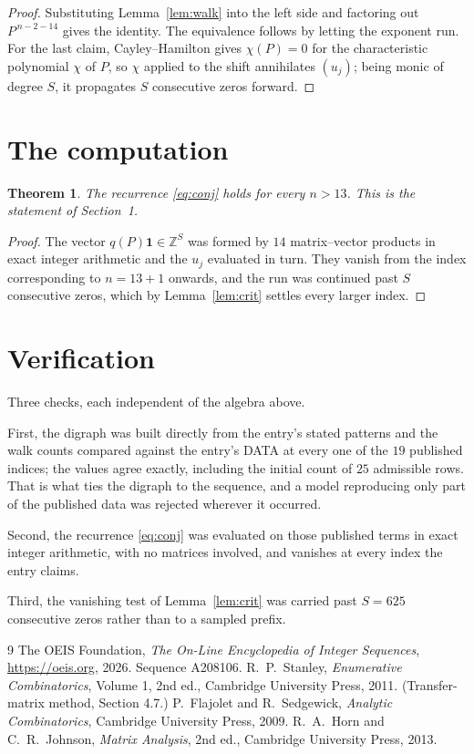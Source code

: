 \documentclass[11pt,a4paper]{article}
\theoremstyle{plain}
\newtheorem{theorem}{Theorem}
\theoremstyle{definition}
\begin{document}
\begin{proof}
Substituting Lemma~\ref{lem:walk} into the left side and factoring out
$P^{\,n-2-14}$ gives the identity. The equivalence follows by letting the exponent
run. For the last claim, Cayley--Hamilton gives $\chi(P)=0$ for the characteristic
polynomial $\chi$ of $P$, so $\chi$ applied to the shift annihilates $(u_j)$; being monic of
degree $S$, it propagates $S$ consecutive zeros forward.
\end{proof}

\section{The computation}

\begin{theorem}
The recurrence \eqref{eq:conj} holds for every $n>13$. This is the statement of
Section~1.
\end{theorem}

\begin{proof}
The vector $q(P)\mathbf{1}\in\mathbb{Z}^{S}$ was formed by $14$ matrix--vector
products in exact integer arithmetic and the $u_j$ evaluated in turn. They vanish from the
index corresponding to $n=13+1$ onwards, and the run was continued past $S$ consecutive
zeros, which by Lemma~\ref{lem:crit} settles every larger index.
\end{proof}

\section{Verification}

Three checks, each independent of the algebra above.

First, the digraph was built directly from the entry's stated patterns and the walk counts
compared against the entry's DATA at every one of the $19$ published indices; the
values agree exactly, including the initial count of $25$ admissible rows. That is
what ties the digraph to the sequence, and a model reproducing only part of the published
data was rejected wherever it occurred.

Second, the recurrence \eqref{eq:conj} was evaluated on those published terms in exact
integer arithmetic, with no matrices involved, and vanishes at every index the entry claims.

Third, the vanishing test of Lemma~\ref{lem:crit} was carried past $S=625$ consecutive
zeros rather than to a sampled prefix.

\begin{thebibliography}{9}
 The OEIS Foundation, \emph{The On-Line Encyclopedia of Integer
Sequences}, \url{https://oeis.org}, 2026. Sequence A208106.
 R.~P.~Stanley, \emph{Enumerative Combinatorics}, Volume 1, 2nd ed.,
Cambridge University Press, 2011. (Transfer-matrix method, Section 4.7.)
 P.~Flajolet and R.~Sedgewick, \emph{Analytic Combinatorics}, Cambridge
University Press, 2009.
 R.~A.~Horn and C.~R.~Johnson, \emph{Matrix Analysis}, 2nd ed., Cambridge
University Press, 2013.
\end{thebibliography}
\end{document}

